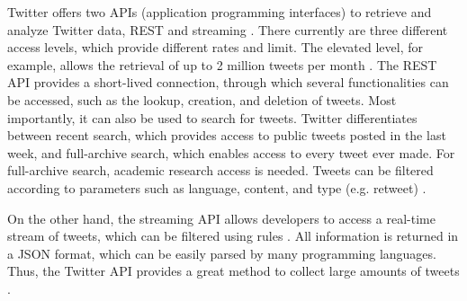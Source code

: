 Twitter offers two APIs (application programming interfaces) to retrieve and analyze Twitter data, REST and streaming \cite{DBLP:journals/csur/GiachanouC16}. There currently are three different access levels, which provide different rates and limit. The elevated level, for example, allows the retrieval of up to 2 million tweets per month \cite{twitter:about}. The REST API provides a short-lived connection, through which several functionalities can be accessed, such as the lookup, creation, and deletion of tweets. Most importantly, it can also be used to search for tweets. Twitter differentiates between recent search, which provides access to public tweets posted in the last week, and full-archive search, which enables access to every tweet ever made. For full-archive search, academic research access is needed. Tweets can be filtered according to parameters such as language, content, and type (e.g. retweet) \cite{twitter:search}. 

On the other hand, the streaming API allows developers to access a real-time stream of tweets, which can be filtered using rules \cite{twitter:stream}. All information is returned in a JSON format, which can be easily parsed by many programming languages. Thus, the Twitter API provides a great method to collect large amounts of tweets \cite{DBLP:journals/csur/GiachanouC16}.




